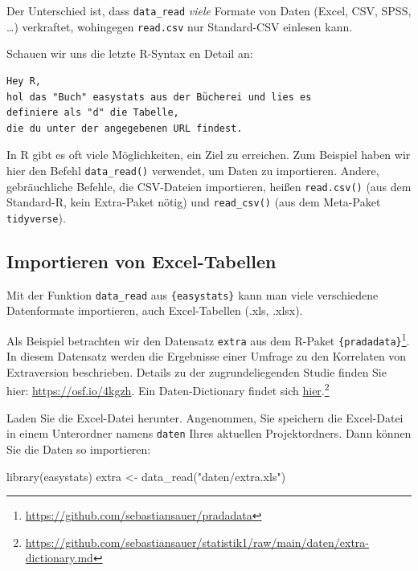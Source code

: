 \documentclass[
  letterpaper,
]{scrbook}
\newenvironment{Shaded}{\begin{snugshade}}{\end{snugshade}}
\newcommand{\FunctionTok}[1]{\textcolor[rgb]{0.28,0.35,0.67}{#1}}
\newcommand{\NormalTok}[1]{\textcolor[rgb]{0.00,0.23,0.31}{#1}}
\newcommand{\OtherTok}[1]{\textcolor[rgb]{0.00,0.23,0.31}{#1}}
\newcommand{\StringTok}[1]{\textcolor[rgb]{0.13,0.47,0.30}{#1}}
\theoremstyle{definition}
\theoremstyle{definition}
\theoremstyle{definition}
\theoremstyle{remark}
\begin{document}
Der Unterschied ist, dass \texttt{data\_read} \emph{viele} Formate von
Daten (Excel, CSV, SPSS, \ldots) verkraftet, wohingegen
\texttt{read.csv} nur Standard-CSV einlesen kann.

Schauen wir uns die letzte R-Syntax en Detail an:

\begin{verbatim}
Hey R,
hol das "Buch" easystats aus der Bücherei und lies es
definiere als "d" die Tabelle,
die du unter der angegebenen URL findest.
\end{verbatim}

In R gibt es oft viele Möglichkeiten, ein Ziel zu erreichen. Zum
Beispiel haben wir hier den Befehl \texttt{data\_read()} verwendet, um
Daten zu importieren. Andere, gebräuchliche Befehle, die CSV-Dateien
importieren, heißen \texttt{read.csv()} (aus dem Standard-R, kein
Extra-Paket nötig) und \texttt{read\_csv()} (aus dem Meta-Paket
\texttt{tidyverse}).

\subsection{Importieren von
Excel-Tabellen}\label{importieren-von-excel-tabellen}

Mit der Funktion \texttt{data\_read} aus \texttt{\{easystats\}} kann man
viele verschiedene Datenformate importieren, auch Excel-Tabellen (.xls,
.xlsx).

Als Beispiel betrachten wir den Datensatz \texttt{extra} aus dem R-Paket
\texttt{\{pradadata\}}\footnote{\url{https://github.com/sebastiansauer/pradadata}}.
In diesem Datensatz werden die Ergebnisse einer Umfrage zu den
Korrelaten von Extraversion beschrieben. Details zu der
zugrundeliegenden Studie finden Sie hier: \url{https://osf.io/4kgzh}.
Ein Daten-Dictionary findet sich
\href{https://github.com/sebastiansauer/statistik1/raw/main/daten/extra-dictionary.md}{hier}.\footnote{\url{https://github.com/sebastiansauer/statistik1/raw/main/daten/extra-dictionary.md}}

Laden Sie die Excel-Datei herunter. Angenommen, Sie speichern die
Excel-Datei in einem Unterordner namens \texttt{daten} Ihres aktuellen
Projektordners. Dann können Sie die Daten so importieren:

\begin{Shaded}
\begin{Highlighting}[]
\FunctionTok{library}\NormalTok{(easystats)}
\NormalTok{extra }\OtherTok{\textless{}{-}} \FunctionTok{data\_read}\NormalTok{(}\StringTok{"daten/extra.xls"}\NormalTok{)}
\end{Highlighting}
\end{Shaded}
\end{document}
